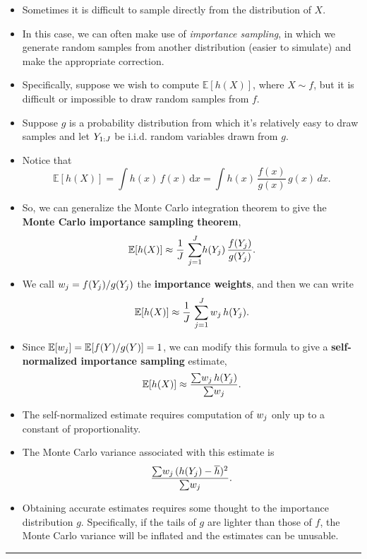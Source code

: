 \documentclass[]{article}
\begin{document}
\begin{itemize}
\item
  Sometimes it is difficult to sample directly from the distribution of
  \(X\).
\item
  In this case, we can often make use of \emph{importance sampling}, in
  which we generate random samples from another distribution (easier to
  simulate) and make the appropriate correction.
\item
  Specifically, suppose we wish to compute \(\mathbb{E}[h(X)]\), where
  \(X\sim{f}\), but it is difficult or impossible to draw random samples
  from \(f\).
\item
  Suppose \(g\) is a probability distribution from which it's relatively
  easy to draw samples and let \(Y_{1:J}\) be i.i.d. random variables
  drawn from \(g\).
\item
  Notice that
  \[\mathbb{E}[h(X)] = \int\!h(x)\,f(x)\,\mathrm{d}x = \int\!h(x)\,\frac{f(x)}{g(x)}\,g(x)\, dx.\]
\item
  So, we can generalize the Monte Carlo integration theorem to give the
  \textbf{Monte Carlo importance sampling theorem},
  \[\mathbb{E}[h(X)] \approx \frac{1}{J}\,\sum_{j=1}^{J}\!h(Y_j)\,\frac{f(Y_j)}{g(Y_j)}.\]
\item
  We call \(w_j=f(Y_j)/g(Y_j)\) the \textbf{importance
  weights}, and then we can write
  \[\mathbb{E}[h(X)] \approx \frac{1}{J}\,\sum_{j=1}^{J} w_j \, h(Y_j).\]
\item
  Since \(\mathbb{E}[w_j] = \mathbb{E}[f(Y)/g(Y)]=1\), we can modify this formula to
  give a \textbf{self-normalized importance sampling} estimate,
  \[\mathbb{E}[h(X)] \approx \frac{\sum\!w_j\,h(Y_j)}{\sum\!w_j}.\]
\item
  The self-normalized estimate requires computation of \(w_j\) only
  up to a constant of proportionality.
\item
  The Monte Carlo variance associated with this estimate is
  \[\frac{\sum\!w_j\,(h(Y_j)-\overline{h})^2}{\sum\!w_j}.\]
\item
  Obtaining accurate estimates requires some thought to the importance
  distribution \(g\). Specifically, if the tails of \(g\) are lighter
  than those of \(f\), the Monte Carlo variance will be inflated and the
  estimates can be unusable.
\end{itemize}

\begin{center}\rule{0.5\linewidth}{\linethickness}\end{center}
\end{document}
